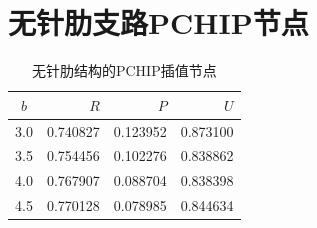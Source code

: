 \documentclass[UTF8,12pt,a4paper]{ctexart}
\begin{document}
\appendix
\section{无针肋支路PCHIP节点}
\begin{table}[H]\centering\small
\caption{无针肋结构的PCHIP插值节点}\label{tab:pchip}
\begin{tabular}{crrr}
\toprule
$b$ & $R$ & $P$ & $U$ \\
\midrule
3.0 & 0.740827 & 0.123952 & 0.873100 \\
3.5 & 0.754456 & 0.102276 & 0.838862 \\
4.0 & 0.767907 & 0.088704 & 0.838398 \\
4.5 & 0.770128 & 0.078985 & 0.844634 \\
\bottomrule
\end{tabular}
\end{table}
\end{document}
